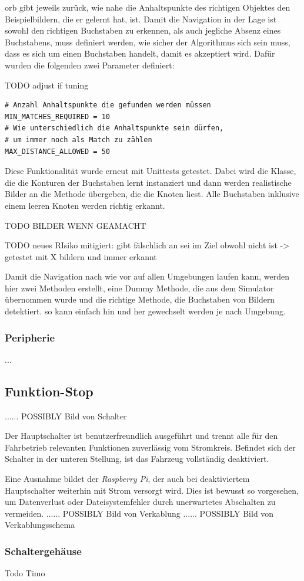 \acrshort{orb} gibt jeweils zurück, wie nahe die Anhaltspunkte des richtigen Objektes den Beispielbildern, die er gelernt hat, ist. Damit die Navigation in der Lage ist sowohl den richtigen Buchstaben zu erkennen, als auch jegliche Absenz eines Buchstabens, muss definiert werden, wie sicher der Algorithmus sich sein muss, dass es sich um einen Buchstaben handelt, damit es akzeptiert wird. Dafür wurden die folgenden zwei Parameter definiert:

TODO adjust if tuning
\begin{verbatim}
# Anzahl Anhaltspunkte die gefunden werden müssen
MIN_MATCHES_REQUIRED = 10
# Wie unterschiedlich die Anhaltspunkte sein dürfen,
# um immer noch als Match zu zählen
MAX_DISTANCE_ALLOWED = 50
\end{verbatim}

Diese Funktionalität wurde erneut mit Unittests getestet.
Dabei wird die Klasse, die die Konturen der Buchstaben lernt instanziert und dann werden realistische Bilder an die Methode übergeben, die die Knoten liest. Alle Buchstaben inklusive einem leeren Knoten werden richtig erkannt.

TODO BILDER WENN GEAMACHT

TODO neues RIsiko mitigiert: gibt fälschlich an sei im Ziel obwohl nicht ist -> getestet mit X bildern und immer erkannt

Damit die Navigation nach wie vor auf allen Umgebungen laufen kann, werden hier zwei Methoden erstellt, eine Dummy Methode, die aus dem Simulator übernommen wurde und die richtige Methode, die Buchstaben von Bildern detektiert. so kann einfach hin und her gewechselt werden je nach Umgebung.

\subsubsection{Peripherie}

...


\newpage
\subsection{Funktion-Stop}

...... POSSIBLY Bild von Schalter

Der Hauptschalter ist benutzerfreundlich ausgeführt und trennt alle für den Fahrbetrieb relevanten Funktionen zuverlässig vom Stromkreis. Befindet sich der Schalter in der unteren Stellung, ist das Fahrzeug vollständig deaktiviert.

Eine Ausnahme bildet der \textit{Raspberry Pi}, der auch bei deaktiviertem Hauptschalter weiterhin mit Strom versorgt wird. Dies ist bewusst so vorgesehen, um Datenverlust oder Dateisystemfehler durch unerwartetes Abschalten zu vermeiden.
...... POSSIBLY Bild von Verkablung
...... POSSIBLY Bild von Verkablungsschema

\subsubsection{Schaltergehäuse}
Todo Timo

